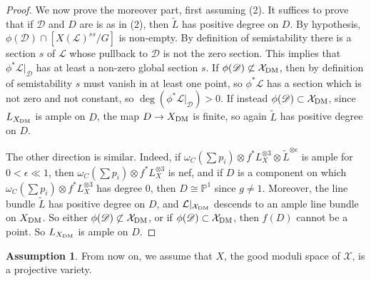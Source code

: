 \documentclass{amsart}
\newcommand{\bP}{\mathbb{P}}
\newcommand{\sD}{\mathscr{D}}
\newcommand{\cB}{\mathcal{B}}
\newcommand{\cL}{\mathcal{L}}
\newcommand{\cX}{\mathcal{X}}
\newcommand{\bmu}{\bm{\mu}}
\newcommand{\dm}{{\rm DM}}
\theoremstyle{definition}
\newtheorem{Assumptions}[theorem]{Assumption}
\theoremstyle{definition}
\begin{document}
{\begin{proof}


We now prove the moreover part, first assuming (2). It suffices to prove that if $\sD$ and $D$ are is as in (2), then $\widetilde{L}$ has positive degree on $D$. 
By hypothesis, $\phi(\sD)\cap [X(\cL)^{ss}/G]$ is non-empty. By definition of semistability there is a section $s$ of $\cL$ whose pullback to $\sD$ is not the zero section. This implies that $\phi^*\cL|_\sD$ has at least a non-zero global section $s$. If $\phi(\sD)\not\subset \cX_\dm$, then by definition of semistability $s$ must vanish in at least one point, so $\phi^*\cL$ has a section which is not zero and not constant, so $\deg(\phi^*\cL|_\sD)>0$. If instead $\phi(\sD)\subset\cX_\dm$, since $L_{X_\dm}$ is ample on $D$, the map $D\to X_\dm$ is finite, so again $\widetilde{L}$ has positive degree on $D$.

The other direction is similar. Indeed, if $\omega_C(\sum p_i)\otimes f^*L_X^{\otimes 3}\otimes \widetilde{L}^{\otimes \epsilon}$ is ample for $0<\epsilon \ll 1$, then $\omega_C(\sum p_i)\otimes f^*L_X^{\otimes 3}$ is nef, and if $D$ is a component on which $\omega_C(\sum p_i)\otimes f^*L_X^{\otimes 3}$ has degree 0, then $D\cong \bP^1$ since $g\neq 1$. Moreover, the line bundle $\widetilde{L}$ has positive degree on $D$, and $\cL|_{\cX_\dm}$ descends to an ample line bundle on $X_\dm$. So either $\phi(\sD)\not \subset \cX_\dm$, or if $\phi(\sD)\subset \cX_\dm$, then $f(D)$ cannot be a point. So $L_{X_\dm}$ is ample on $D$.
\end{proof}
\begin{Assumptions}
    From now on, we assume that $X$, the good moduli space of $\cX$, is a projective variety.
\end{Assumptions}



}
\end{document}
